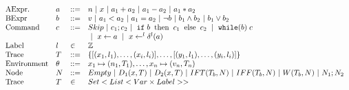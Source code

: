 

\[\begin{array}{llll}
\mbox{AExpr.} & \aexpr & ::= & n~|~ x ~|~ \aexpr_1 + \aexpr_2  ~|~  \aexpr_1 -
                            \aexpr_2 ~|~ \aexpr_1 * \aexpr_2 \\
%
\mbox{BExpr} & \bexpr & ::= & v ~|~  \aexpr_1 < \aexpr_2 ~|~ \aexpr_1
                              = \aexpr_2 ~|~ \neg \bexpr ~|~ \bexpr_1
                              \land \bexpr_2 ~|~ \bexpr_1 \lor \bexpr_2
\\
  \mbox{Command} & \cmd& ::= & Skip ~|~ \cmd_1 ; \cmd_2 ~|~ \impif{\bexpr}{\cmd_1}{\cmd_2}
                               ~|~             \impwhile{\bexpr}{\cmd}  \\
              &&& ~|~\assign{x}{\aexpr} ~|~ \fassign{x}{\aexpr}{l}  
    \\
    \mbox{Label}  & \labl & \in &  \mathbb{Z} \\
    \mbox{Trace} & T & ::= &   \{  [(x_1,\labl_1),\dots, (x_i,
                             \labl_i)],  \dots,  [(y_1,\labl_1),\dots, (y_i,
                             \labl_i)]  \}    \\
\mbox{Environment} & \env & ::= & x_1 \mapsto (n_1, T_1),
                                  \ldots, x_n \mapsto
                                  (\valr_n,T_n) \\
    \mbox{Node}  & \node & ::=&  Empty ~|~D_1(x, T) ~|~ D_2(x,T) ~|~ IFT(T_b, \node) ~|~
                                IFF(T_b, \node) ~|~ W (T_b, \node)
                                ~|~ \node_1 ; \node_2\\
                                  \mbox{Trace} & T & \in  & Set <
                                                            List<Var
                                                            \times Label> >
\end{array}\]







